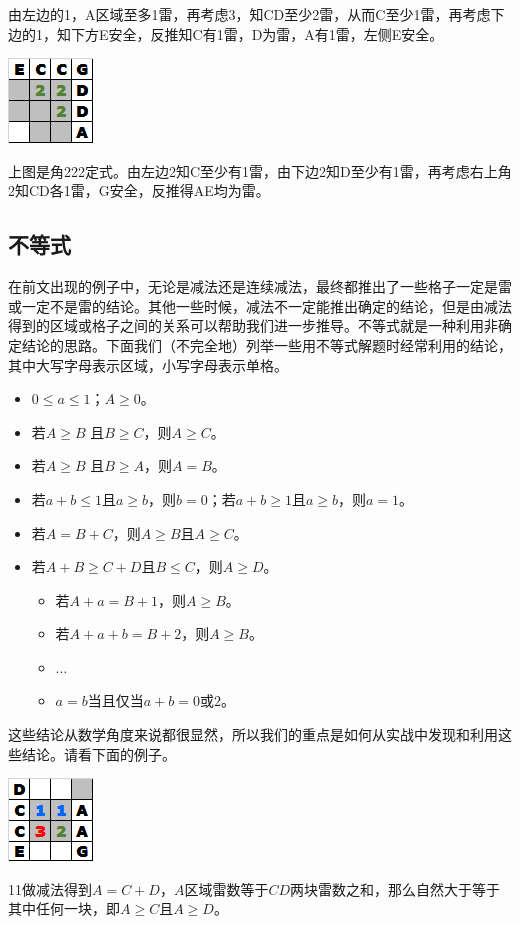 由左边的1，A区域至多1雷，再考虑3，知CD至少2雷，从而C至少1雷，再考虑下边的1，知下方E安全，反推知C有1雷，D为雷，A有1雷，左侧E安全。

\vspace{5mm}
\begin{center}
    \includegraphics{trick/减法6.png}
\end{center}
上图是角222定式。由左边2知C至少有1雷，由下边2知D至少有1雷，再考虑右上角2知CD各1雷，G安全，反推得AE均为雷。

\subsection{不等式}
在前文出现的例子中，无论是减法还是连续减法，最终都推出了一些格子一定是雷或一定不是雷的结论。其他一些时候，减法不一定能推出确定的结论，但是由减法得到的区域或格子之间的关系可以帮助我们进一步推导。不等式就是一种利用非确定结论的思路。下面我们（不完全地）列举一些用不等式解题时经常利用的结论，其中大写字母表示区域，小写字母表示单格。

\begin{itemize}
    \item $0\le a\le 1$；$A\ge 0$。
    \item 若$A\ge B$ 且$B\ge C$，则$A\ge C$。
    \item 若$A\ge B$ 且$B\ge A$，则$A=B$。
    \item 若$a+b\le 1$且$a\ge b$，则$b=0$；若$a+b\ge 1$且$a\ge b$，则$a=1$。
    \item 若$A=B+C$，则$A\ge B$且$A\ge C$。
    \item 若$A+B\ge C+D$且$B\le C$，则$A\ge D$。
    \begin{itemize}
        \item 若$A+a=B+1$，则$A\ge B$。
        \item 若$A+a+b=B+2$，则$A\ge B$。
        \item $\dots$
    \item $a=b$当且仅当$a+b=0$或$2$。
    \end{itemize}
\end{itemize}

这些结论从数学角度来说都很显然，所以我们的重点是如何从实战中发现和利用这些结论。请看下面的例子。

\vspace{5mm}
\begin{center}
    \includegraphics{trick/不等式1.png}
\end{center}
11做减法得到$A=C+D$，$A$区域雷数等于$CD$两块雷数之和，那么自然大于等于其中任何一块，即$A\ge C$且$A\ge D$。


